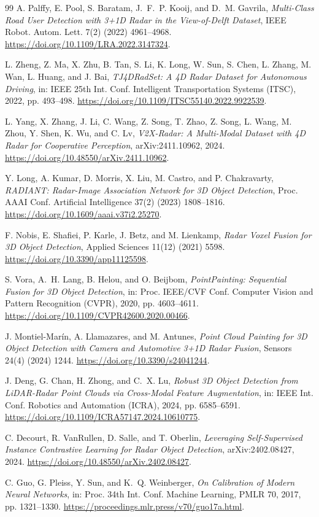 \begin{thebibliography}{99}
A. Palffy, E. Pool, S. Baratam, J.~F.~P. Kooij, and D.~M. Gavrila,
\emph{Multi-Class Road User Detection with 3+1D Radar in the View-of-Delft
Dataset}, IEEE Robot. Autom. Lett. 7(2) (2022) 4961--4968.
\url{https://doi.org/10.1109/LRA.2022.3147324}.

L. Zheng, Z. Ma, X. Zhu, B. Tan, S. Li, K. Long, W. Sun, S. Chen, L. Zhang,
M. Wan, L. Huang, and J. Bai,
\emph{TJ4DRadSet: A 4D Radar Dataset for Autonomous Driving},
in: IEEE 25th Int. Conf. Intelligent Transportation Systems (ITSC), 2022,
pp. 493--498.
\url{https://doi.org/10.1109/ITSC55140.2022.9922539}.

L. Yang, X. Zhang, J. Li, C. Wang, Z. Song, T. Zhao, Z. Song, L. Wang,
M. Zhou, Y. Shen, K. Wu, and C. Lv,
\emph{V2X-Radar: A Multi-Modal Dataset with 4D Radar for Cooperative
Perception}, arXiv:2411.10962, 2024.
\url{https://doi.org/10.48550/arXiv.2411.10962}.

Y. Long, A. Kumar, D. Morris, X. Liu, M. Castro, and P. Chakravarty,
\emph{RADIANT: Radar-Image Association Network for 3D Object Detection},
Proc. AAAI Conf. Artificial Intelligence 37(2) (2023) 1808--1816.
\url{https://doi.org/10.1609/aaai.v37i2.25270}.

F. Nobis, E. Shafiei, P. Karle, J. Betz, and M. Lienkamp,
\emph{Radar Voxel Fusion for 3D Object Detection},
Applied Sciences 11(12) (2021) 5598.
\url{https://doi.org/10.3390/app11125598}.

S. Vora, A.~H. Lang, B. Helou, and O. Beijbom,
\emph{PointPainting: Sequential Fusion for 3D Object Detection},
in: Proc. IEEE/CVF Conf. Computer Vision and Pattern Recognition (CVPR),
2020, pp. 4603--4611.
\url{https://doi.org/10.1109/CVPR42600.2020.00466}.

J. Montiel-Mar\'in, A. Llamazares, and M. Antunes,
\emph{Point Cloud Painting for 3D Object Detection with Camera and Automotive
3+1D Radar Fusion}, Sensors 24(4) (2024) 1244.
\url{https://doi.org/10.3390/s24041244}.

J. Deng, G. Chan, H. Zhong, and C.~X. Lu,
\emph{Robust 3D Object Detection from LiDAR-Radar Point Clouds via
Cross-Modal Feature Augmentation}, in: IEEE Int. Conf. Robotics and
Automation (ICRA), 2024, pp. 6585--6591.
\url{https://doi.org/10.1109/ICRA57147.2024.10610775}.

C. Decourt, R. VanRullen, D. Salle, and T. Oberlin,
\emph{Leveraging Self-Supervised Instance Contrastive Learning for Radar
Object Detection}, arXiv:2402.08427, 2024.
\url{https://doi.org/10.48550/arXiv.2402.08427}.

C. Guo, G. Pleiss, Y. Sun, and K.~Q. Weinberger,
\emph{On Calibration of Modern Neural Networks},
in: Proc. 34th Int. Conf. Machine Learning, PMLR 70, 2017,
pp. 1321--1330.
\url{https://proceedings.mlr.press/v70/guo17a.html}.

\end{thebibliography}
